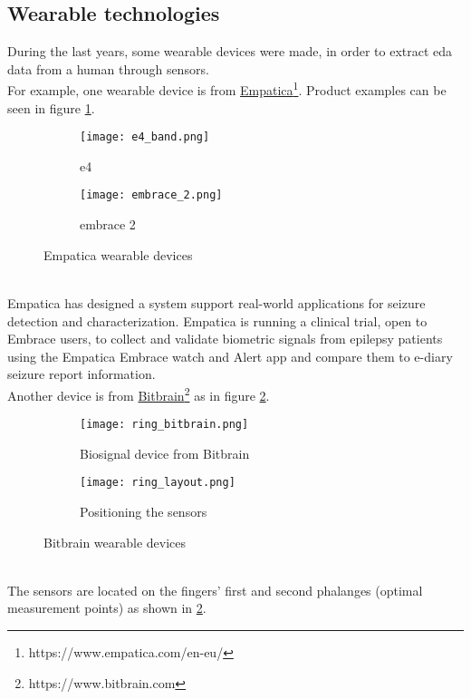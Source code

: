 \subsection{Wearable technologies}
During the last years, some wearable devices were made, in order to extract \gls{eda} data from a human through sensors.
\\ \indent
For example, one wearable device is from \href{https://www.empatica.com/en-eu/}{Empatica}\footnote{https://www.empatica.com/en-eu/}. Product examples can be seen in figure \ref{fig:empatica_devices}.
\begin{figure}[h]
    \centering
    \begin{subfigure}{{0.45\textwidth}}
    		\texttt{[image: e4\_band.png]}
    		\caption{e4}
    \end{subfigure}
    \begin{subfigure}{0.45\textwidth}
    		\texttt{[image: embrace\_2.png]} 
    		\caption{embrace 2}
    \end{subfigure}
    \caption{Empatica wearable devices}
    \label{fig:empatica_devices}
\end{figure}
\\
Empatica has designed a system support real-world applications for seizure detection and characterization. Empatica is running a clinical trial, open to Embrace users, to collect and validate biometric signals from epilepsy patients using the Empatica Embrace watch and Alert app and compare them to e-diary seizure report information.
\\ \indent
Another device is from \href{https://www.bitbrain.com}{Bitbrain}\footnote{https://www.bitbrain.com} as in figure \ref{fig:bitbrain}.
\begin{figure}[h]
    \centering
    \begin{subfigure}{{0.45\textwidth}}
    		\texttt{[image: ring\_bitbrain.png]}
    		\caption{Biosignal device from Bitbrain}
    \end{subfigure}
    \begin{subfigure}{0.45\textwidth}
    		\texttt{[image: ring\_layout.png]} 
    		\caption{Positioning the sensors}
    \end{subfigure}
    \caption{Bitbrain wearable devices}
    \label{fig:bitbrain}
\end{figure}
\\
The sensors are located on the fingers' first and second phalanges (optimal measurement points) as shown in \ref{fig:bitbrain}.
